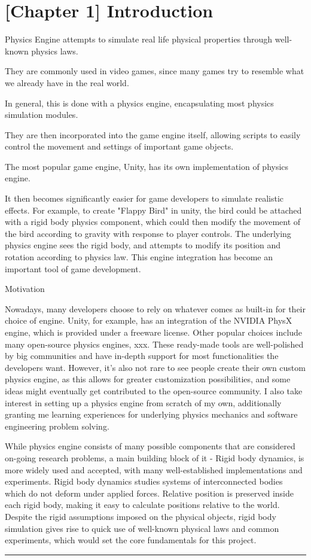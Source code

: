 \documentclass[runningheads]{llncs}
\begin{document}
\chapter{[Chapter 1] Introduction}



Physics Engine attempts to simulate real life physical properties through well-known physics laws.

They are commonly used in video games, since many games try to resemble what we already have in the real world.

In general, this is done with a physics engine, encapsulating most physics simulation modules.

They are then incorporated into the game engine itself, allowing scripts to easily control the movement and settings of important game objects.

The most popular game engine, Unity, has its own implementation of physics engine.

It then becomes significantly easier for game developers to simulate realistic effects. For example, to create "Flappy Bird" in unity, the bird could be attached with a rigid body physics component, which could then modify the movement of the bird according to gravity with response to player controls. The underlying physics engine sees the rigid body, and attempts to modify its position and rotation according to physics law. This engine integration has become an important tool of game development.

Motivation

Nowadays, many developers choose to rely on whatever comes as built-in for their choice of engine. Unity, for example, has an integration of the NVIDIA PhysX engine, which is provided under a freeware license. Other popular choices include many open-source physics engines, xxx. These ready-made tools are well-polished by big communities and have in-depth support for most functionalities the developers want. However, it's also not rare to see people create their own custom physics engine, as this allows for greater customization possibilities, and some ideas might eventually get contributed to the open-source community. I also take interest in setting up a physics engine from scratch of my own, additionally granting me learning experiences for underlying physics mechanics and software engineering problem solving.


While physics engine consists of many possible components that are considered on-going research problems, a main building block of it - Rigid body dynamics, is more widely used and accepted, with many well-established implementations and experiments. Rigid body dynamics studies systems of interconnected bodies which do not deform under applied forces. Relative position is preserved inside each rigid body, making it easy to calculate positions relative to the world. Despite the rigid assumptions imposed on the physical objects, rigid body simulation gives rise to quick use of well-known physical laws and common experiments, which would set the core fundamentals for this project.

\noindent\rule{12cm}{0.4pt}
\end{document}
